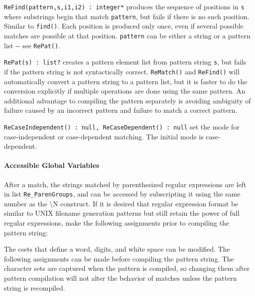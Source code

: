 \texttt{ReFind(pattern,s,i1,i2) : integer*} produces the sequence of
positions in \texttt{s} where substrings begin that match
\texttt{pattern}, but fails if there is no such position. Similar to
\texttt{find()}. Each position is produced only once, even if several
possible matches are possible at that position. \texttt{pattern} can be
either a string or a pattern list -{}- see \texttt{RePat()}.

\texttt{RePat(s) : list?} creates a pattern element list from pattern
string \texttt{s}, but fails if the pattern string is not syntactically
correct. \texttt{ReMatch()} and \texttt{ReFind()} will automatically
convert a pattern string to a pattern list, but it is faster to do the
conversion explicitly if multiple operations are done using the same
pattern. An additional advantage to compiling the pattern separately is
avoiding ambiguity of failure caused by an incorrect pattern and
failure to match a correct pattern.

\texttt{ReCaseIndependent() : null, ReCaseDependent() : null} set the
mode for case-independent or case-dependent matching. The initial mode
is case-dependent.

\paragraph{Accessible Global Variables}
After a match, the strings matched by parenthesized regular expressions
are left in list \texttt{Re\_ParenGroups}, and can be accessed by
subscripting it using the same number as the {\textbackslash}N
construct. If it is desired that regular expression format be similar
to UNIX filename generation patterns but still retain the power of full
regular expressions, make the following assignments prior to compiling
the pattern string:


The csets that define a word, digits, and white
space can be modified. The following assignments can be made before
compiling the pattern string. The character sets are captured when the
pattern is compiled, so changing them after pattern compilation will
not alter the behavior of matches unless the pattern string is
recompiled.



